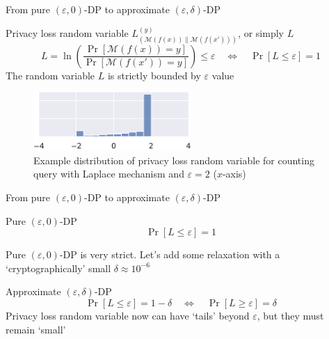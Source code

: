 \documentclass[12pt,aspectratio=169,handout]{beamer}
\begin{document}
\begin{frame}{From pure $(\varepsilon, 0)$-DP to approximate $(\varepsilon, \delta)$-DP}

\begin{block}{Privacy loss random variable $L_{(\mathcal{M}(f(x)) \| \mathcal{M}(f(x')))}^{(y)}$, or simply $L$}
$$
L =
\ln \left(
\frac{
	\Pr \left[ \mathcal{M}(f(x)) = y  \right]
}{
	\Pr \left[ \mathcal{M}(f(x')) = y  \right]
}
\right)
\leq \varepsilon
\quad \iff \quad
\Pr \left[ L \leq \varepsilon \right] = 1
$$
The random variable $L$ is strictly bounded by $\varepsilon$ value
\end{block}

\begin{figure}
	\includegraphics[width=6cm]{img/loss1.pdf}
	\caption{Example distribution of privacy loss random variable for counting query with Laplace mechanism and $\varepsilon = 2$ ($x$-axis)}
\end{figure}



\end{frame}

\begin{frame}{From pure $(\varepsilon, 0)$-DP to approximate $(\varepsilon, \delta)$-DP}
	
\begin{block}{Pure $(\varepsilon, 0)$-DP}
$$
\Pr \left[ L \leq \varepsilon \right] = 1
$$
\end{block}

Pure $(\varepsilon, 0)$-DP is very strict. Let's add some relaxation with a `cryptographically' small $\delta \approx 10^{-6}$

\begin{block}{Approximate $(\varepsilon, \delta)$-DP}
$$
\Pr \left[ L \leq \varepsilon \right] = 1 - \delta
\quad
\iff
\quad
\Pr \left[ L \geq \varepsilon \right] = \delta
$$
Privacy loss random variable now can have `tails' beyond $\varepsilon$, but they must remain `small'
\end{block}
	
\end{frame}
\end{document}
